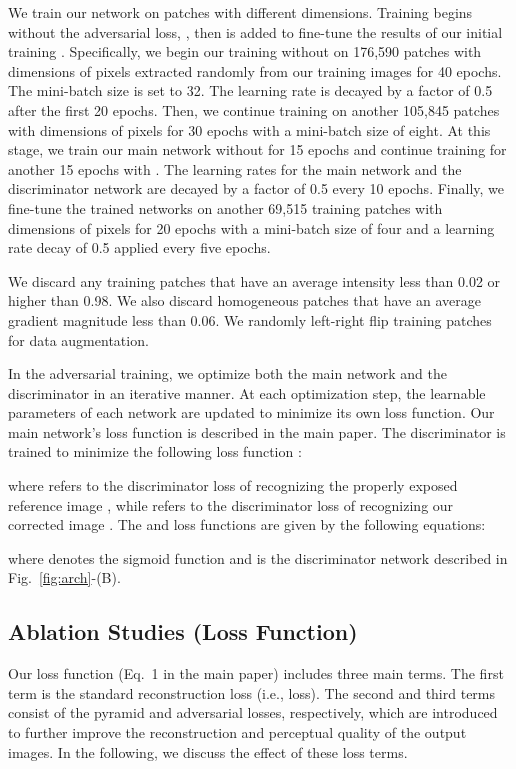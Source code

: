 \documentclass[final]{cvpr}
\begin{document}
We train our network on patches with different dimensions. Training begins without the adversarial loss, , then  is added to fine-tune the results of our initial training \cite{ma2017pose}. Specifically, we begin our training without  on 176,590 patches with dimensions of  pixels extracted randomly from our training images for 40 epochs. The mini-batch size is set to 32. The learning rate is decayed by a factor of 0.5 after the first 20 epochs. Then, we continue training on another 105,845 patches with dimensions of  pixels for 30 epochs with a mini-batch size of eight. At this stage, we train our main network without  for 15 epochs and continue training for another 15 epochs with . The learning rates for the main network and the discriminator network are decayed by a factor of 0.5 every 10 epochs. Finally, we fine-tune the trained networks on another 69,515 training patches with dimensions of  pixels for 20 epochs with a mini-batch size of four and a learning rate decay of 0.5 applied every five epochs.

We discard any training patches that have an average intensity less than 0.02 or higher than 0.98. We also discard homogeneous patches that have an average gradient magnitude less than 0.06. We randomly left-right flip training patches for data augmentation.

In the adversarial training, we optimize both the main network and the discriminator in an iterative manner. At each optimization step, the learnable parameters of each network are updated to minimize its own loss function. Our main network's loss function is described in the main paper. The discriminator is trained to minimize the following loss function \cite{goodfellow2014generative}:


where  refers to the discriminator loss of recognizing the properly exposed reference image , while  refers to the discriminator loss of recognizing our corrected image . The  and  loss functions are given by the following equations: 


    

\noindent where  denotes the sigmoid function and  is the discriminator network described in Fig.\ \ref{fig:arch}-(B). 




\subsection{Ablation Studies (Loss Function)}\label{sec:ablation_study}


Our loss function (Eq.\ 1 in the main paper) includes three main terms. The first term is the standard reconstruction loss (i.e.,  loss). The second and third terms consist of the pyramid and adversarial losses, respectively, which are introduced to further improve the reconstruction and perceptual quality of the output images. In the following, we discuss the effect of these loss terms.
\end{document}

